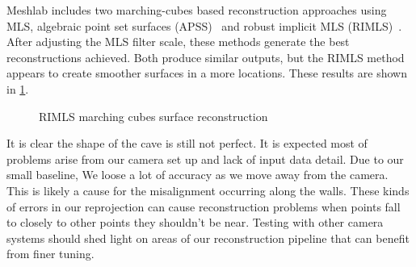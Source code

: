 Meshlab includes two marching-cubes based reconstruction approaches using MLS, algebraic point set surfaces (APSS)~\cite{guennebaud2007algebraic,guennebaud2008dynamic} and robust implicit MLS (RIMLS)~\cite{oztireli2009feature}. After adjusting the MLS filter scale, these methods generate the best reconstructions achieved. Both produce similar outputs, but the RIMLS method appears to create smoother surfaces in a more locations. These results are shown in \ref{fig:rimls}.

\begin{figure}[h]
	\centering
	\caption{RIMLS marching cubes surface reconstruction}
	\label{fig:rimls}
\end{figure}

It is clear the shape of the cave is still not perfect. It is expected most of problems arise from our camera set up and lack of input data detail. Due to our small baseline, We loose a lot of accuracy as we move away from the camera. This is likely a cause for the misalignment occurring along the walls. These kinds of errors in our reprojection can cause reconstruction problems when points fall to closely to other points they shouldn't be near. Testing with other camera systems should shed light on areas of our reconstruction pipeline that can benefit from finer tuning. 
